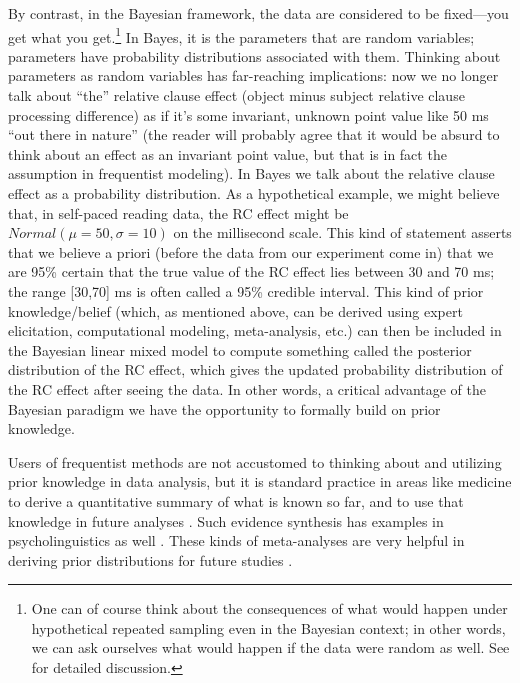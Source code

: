 \documentclass{ar-1col}\usepackage[]{graphicx}\usepackage[]{color}
\begin{document}
By contrast, in the Bayesian framework, the data are considered to be fixed---you get what you get.\footnote{One can of course think about the consequences of what would happen under hypothetical repeated sampling even in the Bayesian context; in other words, we can ask ourselves what would happen if the data were random as well. See \citet{SchadEtAlWorkflow,SchadEtAlBF,vasishth2021sample} for detailed discussion.} In Bayes, it is the parameters that are random variables; parameters have probability distributions associated with them. Thinking about parameters as random variables has far-reaching implications: now we no longer talk about ``the'' relative clause effect (object minus subject relative clause processing difference) as if it's some invariant, unknown point value like 50 ms ``out there in nature'' (the reader will probably agree that it would be absurd to think about an effect as an invariant point value, but that is in fact the assumption in frequentist modeling). 
In Bayes we talk about the relative clause effect as a probability distribution. As a hypothetical example, we might believe \citep[based on prior data or theory or computational modeling; see][for how such prior information can be derived]{ohagan2006uncertain,NicenboimEtAlBayes2019} that, in self-paced reading data, the RC effect might be $\mathit{Normal}(\mu=50,\sigma=10)$ on the millisecond scale. This kind of statement asserts that we believe a priori (before the data from our experiment come in) that we are 95\% certain that the true value of the RC effect lies between 30 and 70 ms; the range [30,70] ms is often called a 95\% credible interval. This kind of prior knowledge/belief (which, as mentioned above, can be derived using expert elicitation, computational modeling, meta-analysis, etc.) can then be included in the Bayesian linear mixed model to compute something called the posterior distribution of the RC effect, which gives the updated probability distribution of the RC effect after seeing the data. In other words, a critical advantage of the Bayesian paradigm we have the opportunity to formally build on prior knowledge.

Users of frequentist methods are not accustomed to thinking about and utilizing prior knowledge in data analysis, but it is standard practice in areas like medicine \citep{cochrane} to derive a quantitative summary of what is known so far, and to use that knowledge in future analyses \citep{spiegelhalter1994bayesian}. Such evidence synthesis has examples in psycholinguistics as well \citep{VasishthetalPLoSOne2013,mahowald2016meta,JaegerEngelmannVasishth2017,NicenboimRoettgeretal,NicenboimPreactivation2019,BuerkiEtAl2020,Buerki2022,cox2022bayesian}. These kinds of meta-analyses are very helpful in deriving prior distributions for future studies \citep{NicenboimEtAlBayes2019,VasishthEngelmann2020}.
\end{document}
